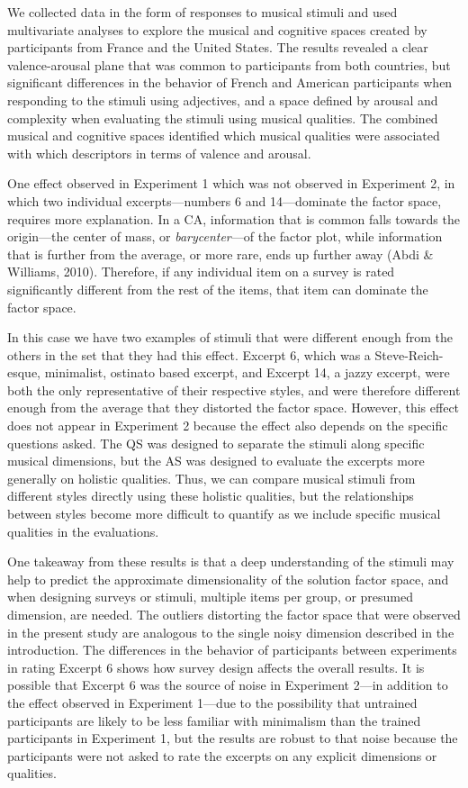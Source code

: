 \documentclass[
  english,
  man,floatsintext]{apa6}
\begin{document}
We collected data in the form of responses to musical stimuli and used multivariate analyses to explore the musical and cognitive spaces created by participants from France and the United States. The results revealed a clear valence-arousal plane that was common to participants from both countries, but significant differences in the behavior of French and American participants when responding to the stimuli using adjectives, and a space defined by arousal and complexity when evaluating the stimuli using musical qualities. The combined musical and cognitive spaces identified which musical qualities were associated with which descriptors in terms of valence and arousal.

One effect observed in Experiment 1 which was not observed in Experiment 2, in which two individual excerpts---numbers 6 and 14---dominate the factor space, requires more explanation. In a CA, information that is common falls towards the origin---the center of mass, or \emph{barycenter}---of the factor plot, while information that is further from the average, or more rare, ends up further away (Abdi \& Williams, 2010). Therefore, if any individual item on a survey is rated significantly different from the rest of the items, that item can dominate the factor space.

In this case we have two examples of stimuli that were different enough from the others in the set that they had this effect. Excerpt 6, which was a Steve-Reich-esque, minimalist, ostinato based excerpt, and Excerpt 14, a jazzy excerpt, were both the only representative of their respective styles, and were therefore different enough from the average that they distorted the factor space. However, this effect does not appear in Experiment 2 because the effect also depends on the specific questions asked. The QS was designed to separate the stimuli along specific musical dimensions, but the AS was designed to evaluate the excerpts more generally on holistic qualities. Thus, we can compare musical stimuli from different styles directly using these holistic qualities, but the relationships between styles become more difficult to quantify as we include specific musical qualities in the evaluations.

One takeaway from these results is that a deep understanding of the stimuli may help to predict the approximate dimensionality of the solution factor space, and when designing surveys or stimuli, multiple items per group, or presumed dimension, are needed. The outliers distorting the factor space that were observed in the present study are analogous to the single noisy dimension described in the introduction. The differences in the behavior of participants between experiments in rating Excerpt 6 shows how survey design affects the overall results. It is possible that Excerpt 6 was the source of noise in Experiment 2---in addition to the effect observed in Experiment 1---due to the possibility that untrained participants are likely to be less familiar with minimalism than the trained participants in Experiment 1, but the results are robust to that noise because the participants were not asked to rate the excerpts on any explicit dimensions or qualities.
\end{document}
